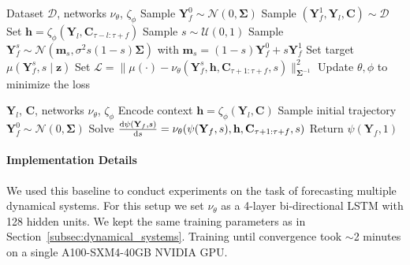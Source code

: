 \documentclass[a4paper,10pt,twocolumn,preprint,3p]{elsarticle}
\begin{document}
\begin{algorithm}[t]
\caption{FM training.}
\begin{small}
\begin{algorithmic}[1]
\Require Dataset $\mathcal{D}$, networks $\nu_\theta$, $\zeta_\phi$
    \State Sample $\mathbf{Y}_f^0 \sim \mathcal{N}(0,\mathbf{\Sigma})$ \State Sample $(\mathbf{Y}_f^1,\mathbf{Y}_l,\mathbf{C}) \sim \mathcal{D}$
    \State Set $\mathbf{h} = \zeta_\phi(\mathbf{Y}_l, \mathbf{C}_{\tau-l:\tau+f})$
    \State Sample $s\sim\mathcal{U}(0,1)$
    \State Sample $\mathbf{Y}_f^s \sim \mathcal{N}\left(\mathbf{m}_s, \sigma^2 s(1-s)\mathbf{\Sigma}\right)$ with $\mathbf{m}_s = (1-s)\mathbf{Y}_f^0 + s\mathbf{Y}_f^1$
    \State Set target $\mu(\mathbf{Y}_f^s,s\mid\mathbf{z})$
    \State Set $\mathcal{L} = \|\mu(\cdot) - \nu_\theta(\mathbf{Y}_f^s, \mathbf{h}, \mathbf{C}_{\tau+1:\tau+f}, s)\|^2_{\mathbf{\Sigma}^{-1}}$
    \State Update $\theta,\phi$ to minimize the loss
\EndWhile
\end{algorithmic}
\end{small}
\label{tab:fmtrain}
\end{algorithm}

\begin{algorithm}[t]
\caption{FM inference.}
\begin{small}
\begin{algorithmic}[1]
\Require $\mathbf{Y}_l$, $\mathbf{C}$, networks $\nu_\theta$, $\zeta_\phi$
\State Encode context $\mathbf{h} = \zeta_\phi(\mathbf{Y}_l, \mathbf{C})$
\State Sample initial trajectory $\mathbf{Y}_f^0 \sim \mathcal{N}(0,\mathbf{\Sigma})$
\State Solve $\dv{\psi(\mathbf{Y}_f,s)}{s} = \nu_\theta(\psi(\mathbf{Y}_f,s), \mathbf{h}, \mathbf{C}_{\tau+1:\tau+f}, s)$
\State Return $\psi(\mathbf{Y}_f,1)$
\end{algorithmic}
\end{small}
\label{tab:fminfer}
\end{algorithm}


\paragraph{Implementation Details}
We used this baseline to conduct experiments on the task of forecasting multiple dynamical systems. For this setup we set $\nu_\theta$ as a 4-layer bi-directional LSTM with 128 hidden units. We kept the same training parameters as in Section~\ref{subsec:dynamical_systems}. Training until convergence took $\sim$2 minutes on a single A100-SXM4-40GB NVIDIA GPU. 
\end{document}

